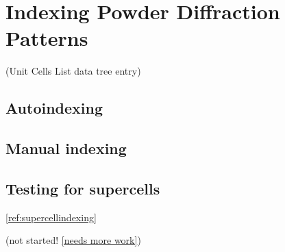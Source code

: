 \chapter{Indexing Powder Diffraction Patterns}\label{Chap:indexing}

(Unit Cells List data tree entry)

\section{Autoindexing}

\section{Manual indexing}

\section{Testing for supercells}

\ref{ref:supercellindexing}

(not started! \ref{needs more work})
